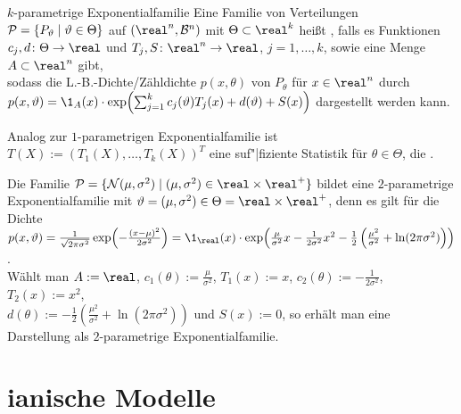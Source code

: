 \linie
\pagebreak

\begin{Def}{$k$-parametrige Exponentialfamilie}
    Eine Familie von Verteilungen $\P = \{P_\theta \;|\; \theta \in \Theta\}$ auf
    $(\real^n, \B^n)$ mit $\Theta \subset \real^k$ heißt
    , falls
    es Funktionen\\
    $c_j, d\colon \Theta \rightarrow \real$ und
    $T_j, S\colon \real^n \rightarrow \real$, $j = 1, \dotsc, k$,
    sowie eine Menge $A \subset \real^n$ gibt,\\
    sodass die L.-B.-Dichte/Zähldichte $p(x, \theta)$ von $P_\theta$ für $x \in \real^n$
    durch\\
    $p(x, \theta) = \1_A(x) \cdot
    \exp\!\left(\sum_{j=1}^k c_j(\theta) T_j(x) + d(\theta) + S(x)\right)$
    dargestellt werden kann.
\end{Def}

\begin{Bem}
    Analog zur $1$-parametrigen Exponentialfamilie ist $T(X) := (T_1(X), \dotsc, T_k(X))^T$
    eine suf"|fiziente Statistik für $\theta \in \Theta$,
    die .
\end{Bem}

\begin{Bsp}
    Die Familie $\P = \{\N(\mu, \sigma^2) \;|\; (\mu, \sigma^2) \in \real \times \real^+\}$ bildet
    eine $2$-parametrige Exponentialfamilie mit
    $\theta = (\mu, \sigma^2) \in \Theta = \real \times \real^+$, denn es gilt für die Dichte\\
    $p(x, \theta) = \frac{1}{\sqrt{2\pi\sigma^2}}
    \exp\!\left(-\frac{(x - \mu)^2}{2\sigma^2}\right) =
    \1_\real(x) \cdot \exp\!\left(\frac{\mu}{\sigma^2}x - \frac{1}{2\sigma^2} x^2 -
    \frac{1}{2} \left(\frac{\mu^2}{\sigma^2} + \ln(2\pi\sigma^2)\right)\right)$.\\
    Wählt man $A := \real$, $c_1(\theta) := \frac{\mu}{\sigma^2}$, $T_1(x) := x$,
    $c_2(\theta) := -\frac{1}{2\sigma^2}$, $T_2(x) := x^2$,\\
    $d(\theta) := -\frac{1}{2} \left(\frac{\mu^2}{\sigma^2} + \ln(2\pi\sigma^2)\right)$
    und $S(x) := 0$, so erhält man eine Darstellung als $2$-parametrige Exponentialfamilie.
\end{Bsp}

\section{%
    ianische Modelle%
}

